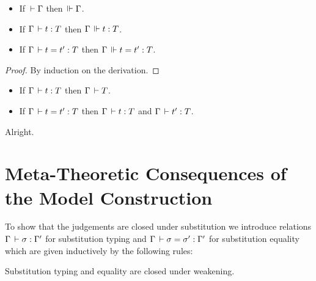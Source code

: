 \documentclass[a4paper,english]{lipics-utf8x}
\begin{document}
  \begin{theorem}
    \leavevmode
    \begin{itemize}
      \item If $\,\vdash \Gamma$ then $\,\Vdash \Gamma$.
      \item If $\Gamma \,\vdash t : T$ then $\Gamma \,\Vdash t : T$.
      \item If $\Gamma \,\vdash t = t' : T$ then $\Gamma \,\Vdash t = t' : T$.
    \end{itemize}
  \end{theorem}

  \begin{proof}
    By induction on the derivation.
  \end{proof}

  \begin{corollary}
    \leavevmode
    \begin{itemize}
      \item If $\Gamma \,\vdash t : T$ then $\Gamma \,\vdash T$.
      \item If $\Gamma \,\vdash t = t' : T$ then $\Gamma \,\vdash t : T$ and
      $\Gamma \,\vdash t' : T$.
    \end{itemize}
  \end{corollary}
  Alright.

  \section{Meta-Theoretic Consequences of the Model Construction}


  To show that the judgements are closed under substitution we introduce
  relations $\Gamma \,\vdash \sigma : \Gamma'$ for substitution typing and
  $\Gamma \,\vdash \sigma = \sigma' : \Gamma'$ for substitution equality
  which are given inductively by the following rules:

  \begin{mathc}
    \ru{\der \Gamma
      }{\Gamma \der \sigma : \cdot}
    \qquad
  \end{mathc}

  \begin{mathc}
    \qquad
  \end{mathc}
  Substitution typing and equality are closed under weakening.
\end{document}
